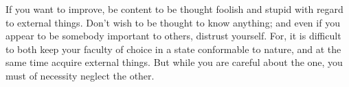 If you want to improve, be content to be thought foolish and stupid
with regard to external things. Don't wish to be thought to know anything;
and even if you appear to be somebody important to others, distrust
yourself. For, it is difficult to both keep your faculty of choice
in a state conformable to nature, and at the same time acquire external
things. But while you are careful about the one, you must of necessity
neglect the other. 
